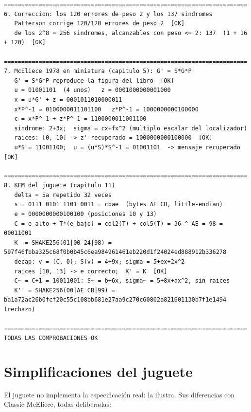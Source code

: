 \begin{lstlisting}[numbers=none]
======================================================================
6. Correccion: los 120 errores de peso 2 y los 137 sindromes
   Patterson corrige 120/120 errores de peso 2  [OK]
   de los 2^8 = 256 sindromes, alcanzables con peso <= 2: 137  (1 + 16 + 120)  [OK]

======================================================================
7. McEliece 1978 en miniatura (capitulo 5): G' = S*G*P
   G' = S*G*P reproduce la figura del libro  [OK]
   u = 01001101  (4 unos)   z = 0001000000001000
   x = u*G' + z = 0001011010000011
   x*P^-1 = 0100000011101100   z*P^-1 = 1000000000100000
   c = x*P^-1 + z*P^-1 = 1100000011001100
   sindrome: 2+3x;  sigma = cx+fx^2 (multiplo escalar del localizador)
   raices: [0, 10] -> z' recuperado = 1000000000100000  [OK]
   u*S = 11001100;  u = (u*S)*S^-1 = 01001101  -> mensaje recuperado  [OK]

======================================================================
8. KEM del juguete (capitulo 11)
   delta = 5a repetido 32 veces
   s = 0111 0101 1101 0011 = cbae  (bytes AE CB, little-endian)
   e = 0000000000100100 (posiciones 10 y 13)
   C = e_alto + T*(e_bajo) = col2(T) + col5(T) = 36 ^ AE = 98 = 00011001
   K  = SHAKE256(01|00 24|98) = 597f46fbba325c68f0b0b45c6ea984961461eb220d1f24024ed888912b336278
   decap: v = (C, 0); S(v) = 4+9x; sigma = 5+ex+2x^2
   raices [10, 13] -> e correcto;  K' = K  [OK]
   C~ = C+1 = 10011001: S~ = b+6x, sigma~ = 5+8x+ax^2, sin raices
   K'' = SHAKE256(00|AE CB|99) = ba1a72ac26b0fcf20c55c108bb681e27aa9c270c60802a821601130b7f1e1494  (rechazo)

======================================================================
TODAS LAS COMPROBACIONES OK
\end{lstlisting}

\section{Simplificaciones del juguete}

El juguete no implementa la especificación real: la ilustra. Sus
diferencias con Classic McEliece, todas deliberadas:

